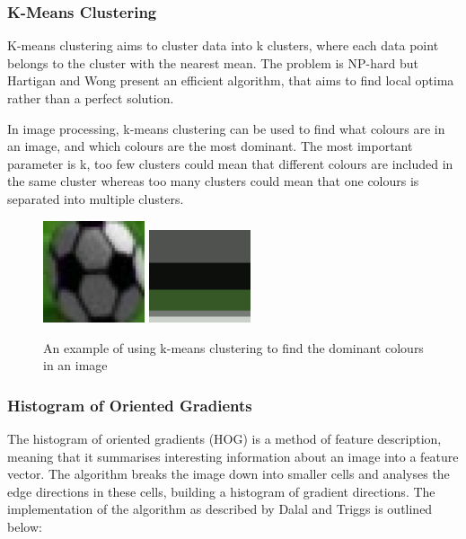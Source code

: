 \subsubsection{K-Means Clustering}

K-means clustering aims to cluster data into k clusters, where each data point belongs to the cluster with the nearest mean. The problem is NP-hard but Hartigan and Wong\cite{Hartigan1979} present an efficient algorithm, that aims to find local optima rather than a perfect solution.

In image processing, k-means clustering can be used to find what colours are in an image, and which colours are the most dominant. The most important parameter is k, too few clusters could mean that different colours are included in the same cluster whereas too many clusters could mean that one colours is separated into multiple clusters.

\begin{figure}[ht]
\includegraphics[width=3cm]{images/kmeans_ball.png}
\includegraphics[width=3cm]{images/kmeans_palette.png}
\centering
\caption{An example of using k-means clustering to find the dominant colours in an image}
\end{figure}

\subsubsection{Histogram of Oriented Gradients}

The histogram of oriented gradients (HOG) is a method of feature description, meaning that it summarises interesting information about an image into a feature vector. The algorithm breaks the image down into smaller cells and analyses the edge directions in these cells, building a histogram of gradient directions. The implementation of the algorithm as described by Dalal and Triggs \cite{Dalal2005} is outlined below:

